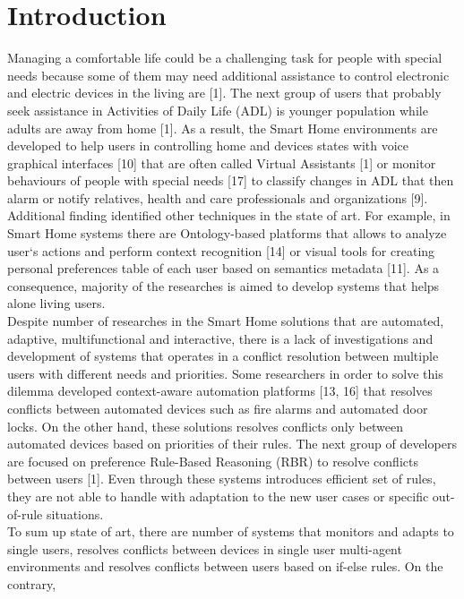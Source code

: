 \documentclass{llncs}
\begin{document}
    \section{Introduction}
    Managing a comfortable life could be a challenging task for people with special needs because some of them may need additional
    assistance to control electronic and electric devices in the living are [1]. The next group of users that probably seek
    assistance in Activities of Daily Life (ADL) is younger population while adults are away from home [1]. As a result,
    the Smart Home environments are developed to help users in controlling home and devices states with voice graphical
    interfaces [10] that are often called Virtual Assistants [1] or monitor behaviours of people
    with special needs [17] to classify changes in ADL that then alarm or notify relatives, health and care professionals
    and organizations [9]. Additional finding identified other techniques in the state of art.
    For example, in Smart Home systems there are Ontology-based platforms that allows to analyze user`s actions and
    perform context recognition [14] or visual tools for creating personal preferences table of each user based on semantics
    metadata [11]. As a consequence, majority of the researches is aimed to develop systems that helps alone living users.\\
    Despite number of
    researches in the Smart Home solutions that are automated, adaptive, multifunctional and interactive, there is a lack of
    investigations and development of systems that operates in a conflict resolution between multiple users with different
    needs and priorities. Some researchers in order to solve this dilemma developed context-aware automation platforms
    [13, 16] that resolves conflicts between automated devices such as fire alarms and automated door locks.
    On the other hand, these solutions resolves conflicts only between automated devices based on priorities of their rules.
    The next group of
    developers are focused on preference Rule-Based Reasoning (RBR) to resolve conflicts between users [1]. Even through
    these systems introduces efficient set of rules, they are not able to handle with adaptation to the new user cases or
    specific out-of-rule situations. \\
    To sum up
    state of art, there are number of systems that monitors and adapts to single users, resolves conflicts between devices
    in single user multi-agent environments and resolves conflicts between users based on if-else rules. On the contrary,
\end{document}
